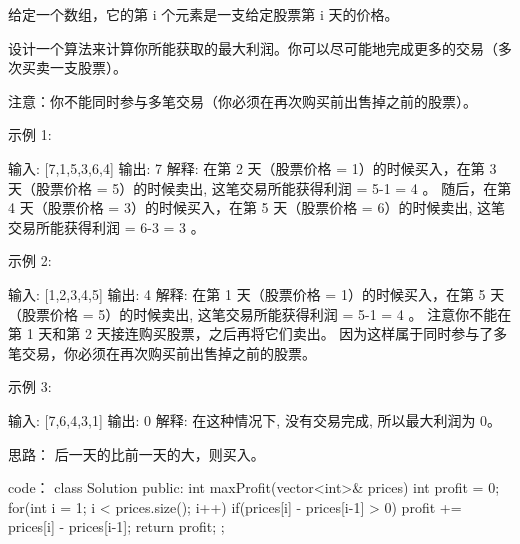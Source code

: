 给定一个数组，它的第 i 个元素是一支给定股票第 i 天的价格。

设计一个算法来计算你所能获取的最大利润。你可以尽可能地完成更多的交易（多次买卖一支股票）。

注意：你不能同时参与多笔交易（你必须在再次购买前出售掉之前的股票）。

示例 1:

输入: [7,1,5,3,6,4]
输出: 7
解释: 在第 2 天（股票价格 = 1）的时候买入，在第 3 天（股票价格 = 5）的时候卖出, 这笔交易所能获得利润 = 5-1 = 4 。
     随后，在第 4 天（股票价格 = 3）的时候买入，在第 5 天（股票价格 = 6）的时候卖出, 这笔交易所能获得利润 = 6-3 = 3 。

示例 2:

输入: [1,2,3,4,5]
输出: 4
解释: 在第 1 天（股票价格 = 1）的时候买入，在第 5 天 （股票价格 = 5）的时候卖出, 这笔交易所能获得利润 = 5-1 = 4 。
     注意你不能在第 1 天和第 2 天接连购买股票，之后再将它们卖出。
     因为这样属于同时参与了多笔交易，你必须在再次购买前出售掉之前的股票。

示例 3:

输入: [7,6,4,3,1]
输出: 0
解释: 在这种情况下, 没有交易完成, 所以最大利润为 0。






























思路：
后一天的比前一天的大，则买入。


























code：
class Solution {
public:
    int maxProfit(vector<int>& prices) {
        int profit = 0;
        for(int i = 1; i < prices.size(); i++)
        {
            if(prices[i] - prices[i-1] > 0)
                profit += prices[i] - prices[i-1];
        }
        return profit;
    }
};
